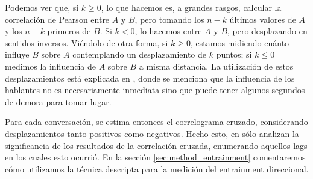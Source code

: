 Podemos ver que, si $k \geq 0$, lo que hacemos es, a grandes rasgos, calcular la correlación de Pearson entre $A$ y $B$, pero tomando los $n-k$ últimos valores de $A$ y los $n-k$ primeros de $B$. Si $k < 0$, lo hacemos entre $A$ y $B$, pero desplazando en sentidos inversos. Viéndolo de otra forma, si $k \geq 0$, estamos midiendo cuánto influye $B$ sobre $A$ contemplando un desplazamiento de $k$ puntos; si $k \leq 0$ medimos la influencia de $A$ sobre $B$ a misma distancia. La utilización de estos desplazamientos está explicada en \cite{gravano2015backward}, donde se menciona que la influencia de los hablantes no es necesariamente inmediata sino que puede tener algunos segundos de demora para tomar lugar.


Para cada conversación, se estima entonces el correlograma cruzado, considerando desplazamientos tanto positivos como negativos. Hecho esto, en \cite{KOU2008.2} sólo analizan la significancia de los resultados de la correlación cruzada, enumerando aquellos lags en los cuales esto ocurrió. En la sección \ref{sec:method_entrainment} comentaremos cómo utilizamos la técnica descripta para la medición del entrainment direccional.

